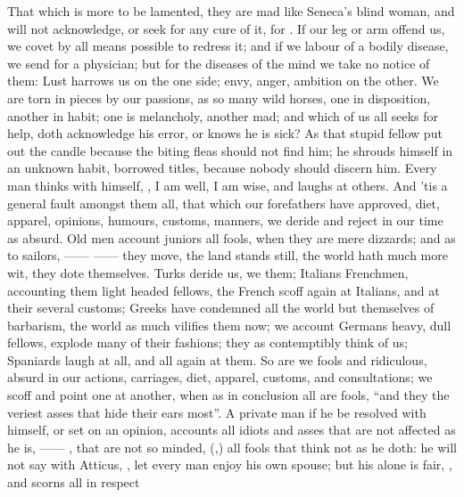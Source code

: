 That which is more to be lamented, they are mad like Seneca's blind woman, and
will not acknowledge, or seek for any cure of it, for
. If our leg or arm offend us, we
covet by all means possible to redress it; and if we labour
of a bodily disease, we send for a physician; but for the diseases of the mind
we take no notice of them: Lust harrows us on the one side;
envy, anger, ambition on the other. We are torn in pieces by our passions, as
so many wild horses, one in disposition, another in habit; one is melancholy,
another mad; and which of us all seeks for help, doth
acknowledge his error, or knows he is sick? As that stupid fellow put out the
candle because the biting fleas should not find him; he shrouds himself in an
unknown habit, borrowed titles, because nobody should discern him. Every man
thinks with himself, , I am well, I am wise, and
laughs at others. And 'tis a general fault amongst them all, that
which our forefathers have approved, diet, apparel,
opinions, humours, customs, manners, we deride and reject in our time as
absurd. Old men account juniors all fools, when they are mere dizzards; and as
to sailors, ------  ------ they move, the land
stands still, the world hath much more wit, they dote themselves. Turks deride
us, we them; Italians Frenchmen, accounting them light headed fellows, the
French scoff again at Italians, and at their several customs; Greeks have
condemned all the world but themselves of barbarism, the world as much vilifies
them now; we account Germans heavy, dull fellows, explode many of their
fashions; they as contemptibly think of us; Spaniards laugh at all, and all
again at them. So are we fools and ridiculous, absurd in our actions,
carriages, diet, apparel, customs, and consultations; we
scoff and point one at another, when as in conclusion all
are fools, \enquote{and they the veriest asses that hide their ears
most}. A private man if he be resolved with himself, or set on an opinion,
accounts all idiots and asses that are not affected as he is,
------ , that
are not so minded, (,) all fools that think not as he doth: he will not say with
Atticus, , let every man enjoy his own
spouse; but his alone is fair, , \etc{} and scorns all in respect
